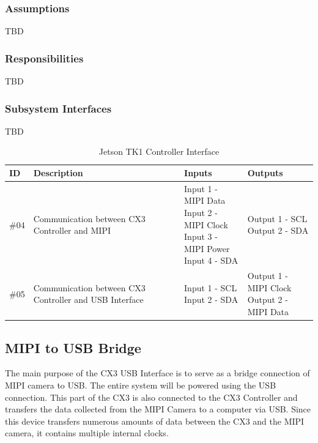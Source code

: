 \subsubsection{Assumptions}
TBD

\subsubsection{Responsibilities}
TBD

\subsubsection{Subsystem Interfaces}
TBD

\begin {table}[H]
\caption {Jetson TK1 Controller Interface}
\begin{center}
    \begin{tabular}{ | p{1cm} | p{6cm} | p{3cm} | p{3cm} |}
    \hline
    ID & Description & Inputs & Outputs \\ \hline
    \#04 & Communication between CX3 Controller and MIPI & \pbox{3cm}{Input 1 - MIPI Data \\ Input 2 - MIPI Clock \\ Input 3 - MIPI Power \\ Input 4 - SDA} & \pbox{3cm}{Output 1 - SCL \\ Output 2 - SDA}  \\ \hline
    \#05 & Communication between CX3 Controller and USB Interface & \pbox{3cm}{Input 1 - SCL \\ Input 2 - SDA} & \pbox{3cm}{Output 1 - MIPI Clock \\ Output 2 - MIPI Data}  \\ \hline
    \end{tabular}
\end{center}
\end{table}

\subsection{MIPI to USB Bridge}
The main purpose of the CX3 USB Interface is to serve as a bridge connection of MIPI camera to USB. The entire system will be powered using the USB connection. This part of the CX3 is also connected to the CX3 Controller and transfers the data collected from the MIPI Camera to a computer via USB. Since this device transfers numerous amounts of data between the CX3 and the MIPI camera, it contains multiple internal clocks.

